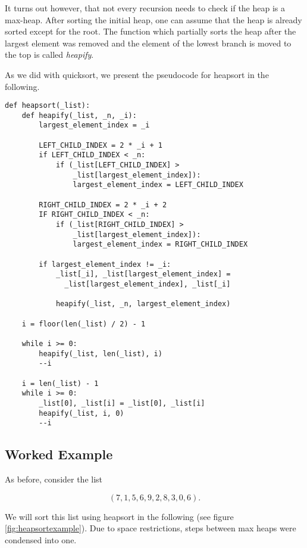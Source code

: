 It turns out however, that not every recursion needs to check if the heap is a max-heap. After sorting the initial heap, one can assume that the heap is already sorted except for the root. The function which partially sorts the heap after the largest element was removed and the element of the lowest branch is moved to the top is called \textit{heapify}.\cite[p.~135]{bib:introductiontoalgorithms} 

As we did with quicksort, we present the pseudocode for heapsort in the following.

\begin{lstlisting}
def heapsort(_list):
    def heapify(_list, _n, _i):
        largest_element_index = _i

        LEFT_CHILD_INDEX = 2 * _i + 1
        if LEFT_CHILD_INDEX < _n:
            if (_list[LEFT_CHILD_INDEX] > 
                _list[largest_element_index]):
                largest_element_index = LEFT_CHILD_INDEX
    
        RIGHT_CHILD_INDEX = 2 * _i + 2
        IF RIGHT_CHILD_INDEX < _n:
            if (_list[RIGHT_CHILD_INDEX] >
                _list[largest_element_index]):
                largest_element_index = RIGHT_CHILD_INDEX
        
        if largest_element_index != _i:
            _list[_i], _list[largest_element_index] =
              _list[largest_element_index], _list[_i]

            heapify(_list, _n, largest_element_index)
            
    i = floor(len(_list) / 2) - 1

    while i >= 0:
        heapify(_list, len(_list), i)
        --i
    
    i = len(_list) - 1
    while i >= 0:
        _list[0], _list[i] = _list[0], _list[i]
        heapify(_list, i, 0)
        --i
\end{lstlisting}

\subsection{Worked Example}
As before, consider the list

\begin{equation*}
    (7, 1, 5, 6, 9, 2, 8, 3, 0, 6)\text{.}
\end{equation*}

We will sort this list using heapsort in the following (see figure \ref{fig:heapsortexample}). Due to space restrictions, steps between max heaps were condensed into one.

